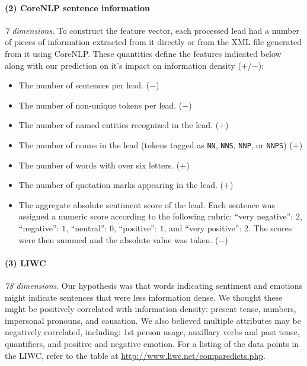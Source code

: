 \documentclass[
10pt, %
a4paper, %
oneside, %
headinclude,footinclude, %
BCOR5mm, %
]{scrartcl}
\begin{document}
\paragraph{\textbf{(2) CoreNLP sentence information}} 
\hfill \newline \noindent \textit{7 dimensions}. To construct the feature
vector, each processed lead had a number of pieces of information extracted from
it directly or from the XML file generated from it using CoreNLP. These
quantities define the features indicated below along with our prediction on it’s
impact on information density ($+$/$-$):
\begin{itemize}
	\item The number of sentences per lead. ($-$)
	\item The number of non-unique tokens per lead. ($-$)
	\item The number of named entities recognized in the lead. ($+$)
	\item The number of nouns in the lead (tokens tagged as \texttt{NN}, \texttt{NNS}, \texttt{NNP}, or \texttt{NNPS}) ($+$)
	\item The number of words with over six letters. ($+$)
	\item The number of quotation marks appearing in the lead. ($+$)
	\item The aggregate absolute sentiment score of the lead. Each sentence was assigned a numeric score according to the following rubric: ``very negative'': $2$, ``negative'': $1$, ``neutral'': $0$, ``positive'': $1$, and ``very positive'': $2$. The scores were then summed and the absolute value was taken. ($-$)
\end{itemize}

\paragraph{\textbf{(3) LIWC}}
\hfill \newline \noindent \textit{78 dimensions}. Our hypothesis was that words
indicating sentiment and emotions might indicate sentences that were less
information dense. We thought these might be positively correlated with
information density: present tense, numbers, impersonal pronouns, and causation.
We also believed multiple attributes may be negatively correlated, including:
1st person usage, auxillary verbs and past tense, quantifiers, and positive and
negative emotion. For a listing of the data points in the LIWC, refer to the
table at \url{http://www.liwc.net/comparedicts.php}.
\end{document}

